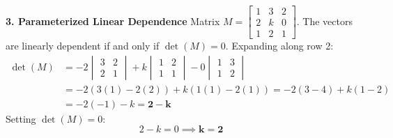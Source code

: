 \textbf{3. Parameterized Linear Dependence}
Matrix $M = \begin{bmatrix} 1 & 3 & 2 \\ 2 & k & 0 \\ 1 & 2 & 1 \end{bmatrix}$. The vectors are linearly dependent if and only if $\det(M) = 0$.
Expanding along row 2:
\begin{align*}
\det(M) &= -2 \begin{vmatrix} 3 & 2 \\ 2 & 1 \end{vmatrix} + k \begin{vmatrix} 1 & 2 \\ 1 & 1 \end{vmatrix} - 0 \begin{vmatrix} 1 & 3 \\ 1 & 2 \end{vmatrix} \\
&= -2(3(1) - 2(2)) + k(1(1) - 2(1)) = -2(3 - 4) + k(1 - 2) \\
&= -2(-1) - k = \mathbf{2 - k}
\end{align*}
Setting $\det(M) = 0$:
\begin{equation*}
2 - k = 0 \implies \mathbf{k = 2}
\end{equation*}

